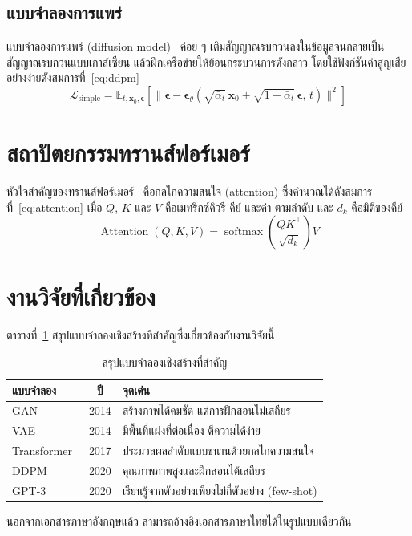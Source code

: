 \subsection{แบบจำลองการแพร่}

แบบจำลองการแพร่ (diffusion model)~\cite{ho2020denoising} ค่อย ๆ เติมสัญญาณรบกวนลงในข้อมูลจนกลายเป็นสัญญาณรบกวนแบบเกาส์เซียน แล้วฝึกเครือข่ายให้ย้อนกระบวนการดังกล่าว โดยใช้ฟังก์ชันค่าสูญเสียอย่างง่ายดังสมการที่~\eqref{eq:ddpm}
\begin{equation}
  \mathcal{L}_{\text{simple}} =
  \mathbb{E}_{t,\mathbf{x}_0,\boldsymbol{\epsilon}}
  \left[\bigl\lVert \boldsymbol{\epsilon}
  - \boldsymbol{\epsilon}_\theta\!\left(\sqrt{\bar{\alpha}_t}\,\mathbf{x}_0
  + \sqrt{1-\bar{\alpha}_t}\,\boldsymbol{\epsilon},\, t\right)\bigr\rVert^2\right]
  \label{eq:ddpm}
\end{equation}

\section{สถาปัตยกรรมทรานส์ฟอร์เมอร์}

หัวใจสำคัญของทรานส์ฟอร์เมอร์~\cite{vaswani2017attention} คือกลไกความสนใจ (attention) ซึ่งคำนวณได้ดังสมการที่~\eqref{eq:attention} เมื่อ $Q$, $K$ และ $V$ คือเมทริกซ์คิวรี คีย์ และค่า ตามลำดับ และ $d_k$ คือมิติของคีย์
\begin{equation}
  \operatorname{Attention}(Q,K,V) = \operatorname{softmax}\!\left(\frac{QK^{\top}}{\sqrt{d_k}}\right)V
  \label{eq:attention}
\end{equation}

\section{งานวิจัยที่เกี่ยวข้อง}

ตารางที่~\ref{tab:related} สรุปแบบจำลองเชิงสร้างที่สำคัญซึ่งเกี่ยวข้องกับงานวิจัยนี้

\begin{table}[htbp]
  \caption{สรุปแบบจำลองเชิงสร้างที่สำคัญ}
  \label{tab:related}
  \centering
  \begin{tabularx}{\linewidth}{@{}l c X@{}}
    \toprule
    \textbf{แบบจำลอง} & \textbf{ปี} & \textbf{จุดเด่น}\\
    \midrule
    GAN~\cite{goodfellow2014generative} & 2014 & สร้างภาพได้คมชัด แต่การฝึกสอนไม่เสถียร\\
    VAE~\cite{kingma2014auto} & 2014 & มีพื้นที่แฝงที่ต่อเนื่อง ตีความได้ง่าย\\
    Transformer~\cite{vaswani2017attention} & 2017 & ประมวลผลลำดับแบบขนานด้วยกลไกความสนใจ\\
    DDPM~\cite{ho2020denoising} & 2020 & คุณภาพภาพสูงและฝึกสอนได้เสถียร\\
    GPT-3~\cite{brown2020language} & 2020 & เรียนรู้จากตัวอย่างเพียงไม่กี่ตัวอย่าง (few-shot)\\
    \bottomrule
  \end{tabularx}
\end{table}

นอกจากเอกสารภาษาอังกฤษแล้ว สามารถอ้างอิงเอกสารภาษาไทยได้ในรูปแบบเดียวกัน~\cite{thai-example}
